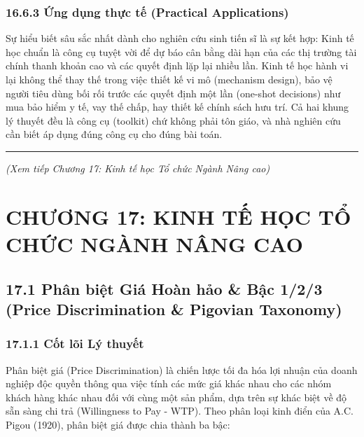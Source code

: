 \documentclass[
]{article}
\begin{document}
\subsubsection{16.6.3 Ứng dụng thực tế (Practical
Applications)}\label{ux1ee9ng-dux1ee5ng-thux1ef1c-tux1ebf-practical-applications-72}

Sự hiểu biết sâu sắc nhất dành cho nghiên cứu sinh tiến sĩ là sự kết
hợp: Kinh tế học chuẩn là công cụ tuyệt vời để dự báo cân bằng dài hạn
của các thị trường tài chính thanh khoản cao và các quyết định lặp lại
nhiều lần. Kinh tế học hành vi lại không thể thay thế trong việc thiết
kế vi mô (mechanism design), bảo vệ người tiêu dùng bối rối trước các
quyết định một lần (one-shot decisions) như mua bảo hiểm y tế, vay thế
chấp, hay thiết kế chính sách hưu trí. Cả hai khung lý thuyết đều là
công cụ (toolkit) chứ không phải tôn giáo, và nhà nghiên cứu cần biết áp
dụng đúng công cụ cho đúng bài toán.

\begin{center}\rule{0.5\linewidth}{0.5pt}\end{center}

\emph{(Xem tiếp Chương 17: Kinh tế học Tổ chức Ngành Nâng cao)}

\section{CHƯƠNG 17: KINH TẾ HỌC TỔ CHỨC NGÀNH NÂNG
CAO}\label{chux1b0ux1a1ng-17-kinh-tux1ebf-hux1ecdc-tux1ed5-chux1ee9c-nguxe0nh-nuxe2ng-cao}

\subsection{17.1 Phân biệt Giá Hoàn hảo \& Bậc 1/2/3 (Price
Discrimination \& Pigovian
Taxonomy)}\label{phuxe2n-biux1ec7t-giuxe1-houxe0n-hux1ea3o-bux1eadc-123-price-discrimination-pigovian-taxonomy}

\subsubsection{17.1.1 Cốt lõi Lý
thuyết}\label{cux1ed1t-luxf5i-luxfd-thuyux1ebft}

Phân biệt giá (Price Discrimination) là chiến lược tối đa hóa lợi nhuận
của doanh nghiệp độc quyền thông qua việc tính các mức giá khác nhau cho
các nhóm khách hàng khác nhau đối với cùng một sản phẩm, dựa trên sự
khác biệt về độ sẵn sàng chi trả (Willingness to Pay - WTP). Theo phân
loại kinh điển của A.C. Pigou (1920), phân biệt giá được chia thành ba
bậc:
\end{document}
